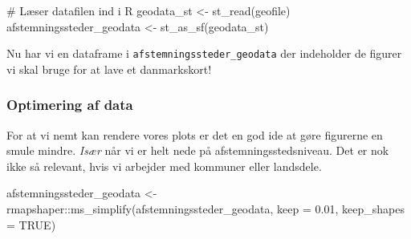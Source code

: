 \documentclass[
  a4paper,
  DIV=11,
  numbers=noendperiod,
  oneside]{scrartcl}
\newenvironment{Shaded}{\begin{snugshade}}{\end{snugshade}}
\newcommand{\AttributeTok}[1]{\textcolor[rgb]{0.40,0.45,0.13}{#1}}
\newcommand{\CommentTok}[1]{\textcolor[rgb]{0.37,0.37,0.37}{#1}}
\newcommand{\ConstantTok}[1]{\textcolor[rgb]{0.56,0.35,0.01}{#1}}
\newcommand{\FloatTok}[1]{\textcolor[rgb]{0.68,0.00,0.00}{#1}}
\newcommand{\FunctionTok}[1]{\textcolor[rgb]{0.28,0.35,0.67}{#1}}
\newcommand{\NormalTok}[1]{\textcolor[rgb]{0.00,0.23,0.31}{#1}}
\newcommand{\OtherTok}[1]{\textcolor[rgb]{0.00,0.23,0.31}{#1}}
\newcommand{\SpecialCharTok}[1]{\textcolor[rgb]{0.37,0.37,0.37}{#1}}
\begin{document}
\begin{Shaded}
\begin{Highlighting}[]
\CommentTok{\# Læser datafilen ind i R}
\NormalTok{geodata\_st }\OtherTok{\textless{}{-}} \FunctionTok{st\_read}\NormalTok{(geofile)}
\NormalTok{afstemningssteder\_geodata }\OtherTok{\textless{}{-}} \FunctionTok{st\_as\_sf}\NormalTok{(geodata\_st)}
\end{Highlighting}
\end{Shaded}


Nu har vi en dataframe i \texttt{afstemningssteder\_geodata} der
indeholder de figurer vi skal bruge for at lave et danmarkskort!

\subsubsection{Optimering af data}\label{optimering-af-data}

For at vi nemt kan rendere vores plots er det en god ide at gøre
figurerne en smule mindre. \emph{Især} når vi er helt nede på
afstemningsstedsniveau. Det er nok ikke så relevant, hvis vi arbejder
med kommuner eller landsdele.

\begin{Shaded}
\begin{Highlighting}[]
\NormalTok{afstemningssteder\_geodata }\OtherTok{\textless{}{-}}\NormalTok{ rmapshaper}\SpecialCharTok{::}\FunctionTok{ms\_simplify}\NormalTok{(afstemningssteder\_geodata,}
                                                     \AttributeTok{keep =} \FloatTok{0.01}\NormalTok{, }\AttributeTok{keep\_shapes =} \ConstantTok{TRUE}\NormalTok{)}
\end{Highlighting}
\end{Shaded}

\end{document}
